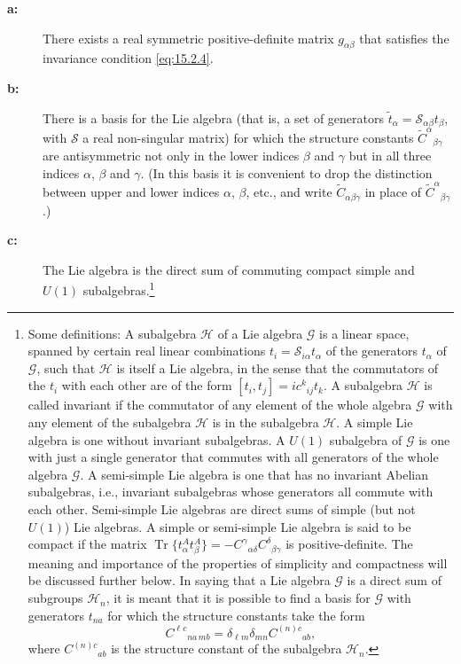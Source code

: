 \begin{description}
 \item[\textbf{a:}] There exists a real symmetric positive-definite matrix
 $g_{\alpha\beta}$ that satisfies the invariance condition
 \eqref{eq:15.2.4}.

 \item[\textbf{b:}] There is a basis for the Lie algebra (that is, a set of
 generators $\widetilde t_\alpha=\mathcal S_{\alpha\beta}t_\beta$, with
 $\mathcal S$ a real non-singular matrix) for which the structure constants
 $\widetilde C^\alpha{}_{\beta\gamma}$ are antisymmetric not only in the lower
 indices $\beta$ and $\gamma$ but in all three indices $\alpha$, $\beta$ and
 $\gamma$. (In this basis it is convenient to drop the distinction between
 upper and lower indices $\alpha$, $\beta$, etc., and write
 $\widetilde C_{\alpha\beta\gamma}$ in place of
 $\widetilde C^\alpha{}_{\beta\gamma}$.)

 \item[\textbf{c:}] The Lie algebra is the direct sum of commuting compact
 simple and $U(1)$ subalgebras.\footnote{Some definitions: A subalgebra
 $\mathcal H$ of a Lie algebra $\mathcal G$ is a linear space, spanned by certain
 real linear combinations $t_i=\mathcal S_{i\alpha}t_\alpha$ of the generators
 $t_\alpha$ of $\mathcal G$, such that $\mathcal H$ is itself a Lie algebra, in
 the sense that the commutators of the $t_i$ with each other are of the form
 $[t_i,t_j]=ic^k{}_{ij}t_k$. A subalgebra $\mathcal H$ is called invariant if
 the commutator of any element of the whole algebra $\mathcal G$ with any
 element of the subalgebra $\mathcal H$ is in the subalgebra $\mathcal H$. A
 simple Lie algebra is one without invariant subalgebras. A $U(1)$ subalgebra
 of $\mathcal G$ is one with just a single generator that commutes with all
 generators of the whole algebra $\mathcal G$. A semi-simple Lie algebra is one
 that has no invariant Abelian subalgebras, i.e., invariant subalgebras whose
 generators all commute with each other. Semi-simple Lie algebras are direct
 sums of simple (but not $U(1)$) Lie algebras. A simple or semi-simple Lie
 algebra is said to be compact if the matrix
 $\operatorname{Tr}\{t^A_\alpha t^A_\beta\}
 =-C^\gamma{}_{\alpha\delta}C^\delta{}_{\beta\gamma}$ is positive-definite.
 The meaning and importance of the properties of simplicity and compactness
 will be discussed further below. In saying that a Lie algebra $\mathcal G$ is
 a direct sum of subgroups $\mathcal H_n$, it is meant that it is possible to
 find a basis for $\mathcal G$ with generators $t_{na}$ for which the structure
 constants take the form
 \[
 C^{\ell c}{}_{na\,mb}=\delta_{\ell m}\delta_{mn}C^{(n)c}{}_{ab} ,
 \]
 where $C^{(n)c}{}_{ab}$ is the structure constant of the subalgebra
 $\mathcal H_n$.}
\end{description}

